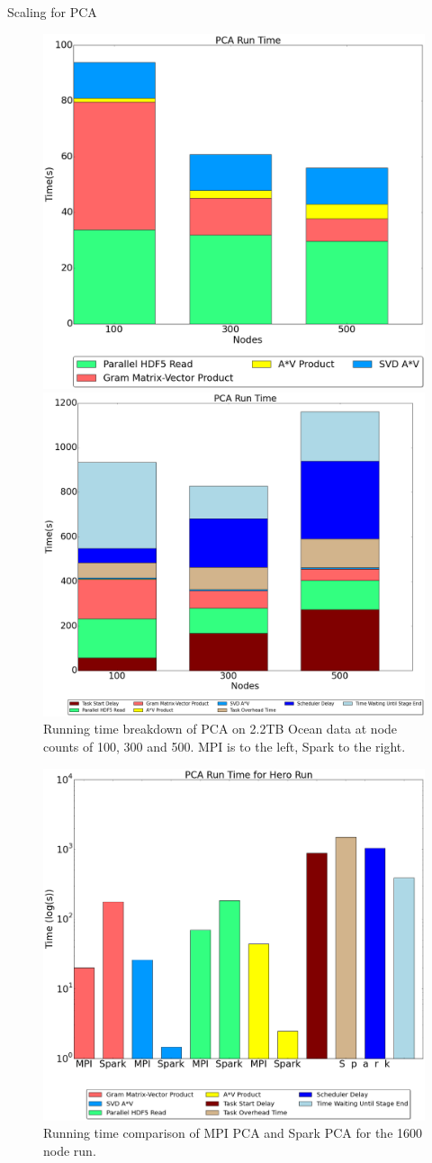 \documentclass[xcolor=x11names,compress,ignorenonframetext,10pt]{beamer}
\renewcommand{\(}{\begin{columns}}
\renewcommand{\)}{\end{columns}}
\newcommand{\<}[1]{\begin{column}{#1}}
\renewcommand{\>}{\end{column}}
\begin{document}
\begin{frame}{Scaling for PCA}
\begin{figure}[th!]
\centering
\includegraphics[width=.45\textwidth]{figures/spark/mpi_pca.png}
\includegraphics[width=.5\textwidth]{figures/spark/spark_pca.png}
\\
Running time breakdown of PCA on 2.2TB Ocean data at node counts of 100, 300 and 500. MPI 
is to the left, Spark to the right.
\end{figure}
\end{frame}

\begin{frame}
\begin{figure}[th!]
\centering
\includegraphics[width=.72\textwidth]{figures/spark/hero_run_summary.png}
\\
Running time comparison of MPI PCA and Spark PCA for the 1600 node run.
\end{figure}
\end{frame}
\end{document}
